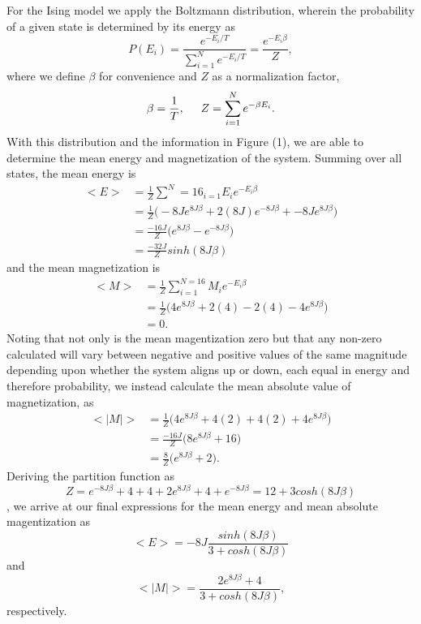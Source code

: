 \documentclass[11pt,a4paper]{article}
\begin{document}
For the Ising model we apply the Boltzmann distribution, wherein the probability of a given state is determined by its energy as
\begin{equation}
P(E_i) = \frac{e^{-E_i/T}}{\sum\limits^N_{i=1} e^{-E_i/T}} = \frac{e^{-E_i\beta}}{Z},
\end{equation}
where we define $\beta$ for convenience and $Z$ as a normalization factor,
\begin{equation}
\beta = \frac{1}{T}, \hspace{0.5 cm} Z = \sum\limits^N_{i=1} e^{-\beta E_i}.
\end{equation}
With this distribution and the information in Figure (1), we are able to determine the mean energy and magnetization of the system. Summing over all states, the mean energy is 
\begin{align*}
<E> &= \frac{1}{Z}\sum\limits^N=16_{i=1} E_i e^{-E_i\beta} \\
	&= \frac{1}{Z}\bigg( -8Je^{8J\beta} + 2(8J)e^{-8J\beta} + -8Je^{8J\beta} \bigg) \\
	&= \frac{-16J}{Z}\bigg(e^{8J\beta} - e^{-8J\beta}\bigg) \\
	&= \frac{-32J}{Z}sinh(8J\beta)
\end{align*}
and the mean magnetization is
\begin{align*}
<M> &= \frac{1}{Z}\sum\limits^{N=16}_{i=1} M_i e^{-E_i\beta} \\
	&= \frac{1}{Z}\bigg( 4e^{8J\beta} + 2(4) - 2(4) - 4e^{8J\beta} \bigg) \\
	&= 0.
\end{align*}
Noting that not only is the mean magentization zero but that any non-zero calculated will vary between negative and positive values of the same magnitude depending upon whether the system aligns up or down, each equal in energy and therefore probability, we instead calculate the mean absolute value of magnetization, as
\begin{align*}
<|M|> 	&= \frac{1}{Z}\bigg( 4e^{8J\beta} + 4(2) + 4(2) + 4e^{8J\beta} \bigg) \\
		&= \frac{-16J}{Z}\bigg(8e^{8J\beta} + 16\bigg) \\
		&= \frac{8}{Z}\bigg(e^{8J\beta} + 2\bigg).
\end{align*}
Deriving the partition function as 
\begin{equation}
Z = e^{-8J\beta} + 4 + 4 + 2e^{8J\beta} + 4 + e^{-8J\beta} = 12 + 3cosh(8J\beta)
\end{equation},
we arrive at our final expressions for the mean energy and mean absolute magentization as
\begin{equation}
<E> = -8J\frac{sinh(8J\beta)}{3 + cosh(8J\beta)}
\end{equation}
and
\begin{equation}
<|M|> = \frac{2e^{8J\beta} + 4}{3+cosh(8J\beta)},
\end{equation}
respectively.
\end{document}
